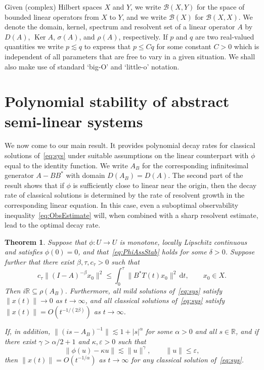 \documentclass[11pt, a4paper]{amsart}
\DeclareMathOperator*{\Ker}{Ker}
\newcommand{\dd}{\mathrm{d}}
\newcommand{\ep}{\varepsilon}
\newcommand{\B}{\mathcal{B}}
\newcommand{\RR}{\mathbb{R}}
\newcommand{\inv}{^{-1}}
\newtheorem{thm}{Theorem}[section]
\theoremstyle{definition}
\numberwithin{equation}{section}
\begin{document}
Given (complex) Hilbert spaces $X$ and $Y$, we write $\B(X,Y)$ for the space of bounded linear operators from $X$ to $Y$, and we write $\B(X)$ for $\B(X,X)$. 
We denote the domain, kernel, spectrum and resolvent set of a linear operator $A$
by  $D(A)$, $\Ker A$, $\sigma(A)$, and $\rho(A)$,  respectively.
If $p$ and $q$ are two real-valued quantities we write $p\lesssim q$ to express that $p\le Cq$ for some constant $C>0$ which is independent of all parameters that are free to vary in a given situation. We shall also make use of standard `big-O' and `little-o'  notation.



\section{Polynomial stability of abstract semi-linear systems}\label{sec:decay}

We now come to our main result. It provides polynomial decay rates for classical solutions of~\eqref{eq:sys} under suitable assumptions on the linear counterpart with $\phi$ equal to the identity function. We write $A_B$ for the corresponding infinitesimal generator $A-BB^*$ with domain $D(A_B)=D(A)$.
The second part of the result shows that if $\phi$ is sufficiently close to linear near the origin, then the decay rate of classical solutions is determined by the rate of resolvent growth in the corresponding linear equation. In this case, even a suboptimal observability inequality~\eqref{eq:ObsEstimate} will, when combined with a sharp resolvent estimate, lead to the optimal decay rate.


\begin{thm}\label{thm:main}
Suppose that $\phi\colon U\to U$ is monotone, locally Lipschitz continuous and satisfies $\phi(0)=0$, and that~\eqref{eq:PhiAssStab}
holds for some $\delta>0$.
Suppose further that there exist $\beta,\tau,c_\tau>0$ such that
\begin{equation}
\label{eq:ObsEstimate}
c_\tau\|(I-A)^{-\beta} x_0\|^2 
\le \int_0^\tau \|B^\ast T(t)x_0\|^2 \,\dd t, \qquad x_0\in X.
\end{equation}
Then
 $i\RR\subseteq\rho(A_B)$. Furthermore,
 all  mild solutions of~\eqref{eq:sys} satisfy $\|x(t)\|\to 0$ as $t\to\infty$, and
 all classical solutions of~\eqref{eq:sys} satisfy $\|x(t)\|=O(t^{-1/(2\beta)})$ as $t\to\infty$.

If, in addition,
$\|(is-A_B)\inv\|\lesssim 1+|s|^\alpha$ for some $\alpha>0$ and all $s\in\RR$, and
 if there exist $\gamma>\alpha/2+1$ and $\kappa,\ep>0$ such that
\begin{equation}
\label{eq:PhiApproximatLinearity}
\|\phi(u)-\kappa u\|\lesssim \|u\|^\gamma, \qquad  \|u\|\le \ep ,
\end{equation}
then $\|x(t)\|= O(t^{-1/\alpha})$ as $t\to\infty$ for any classical solution of~\eqref{eq:sys}.
\end{thm}
\end{document}
